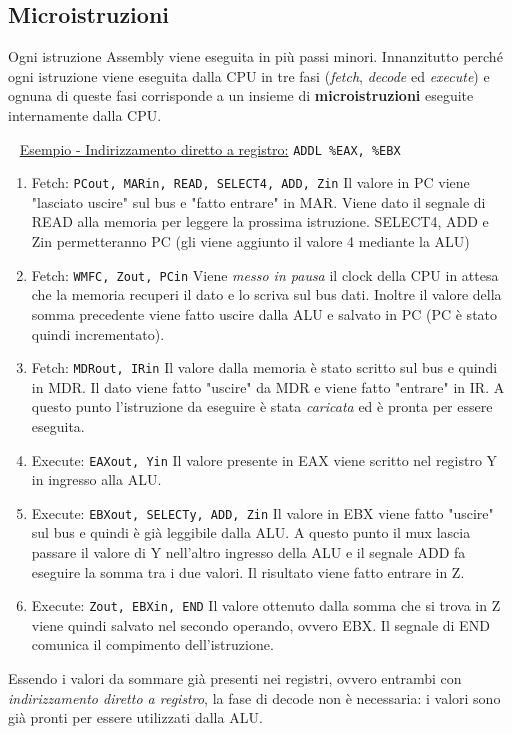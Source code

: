 \documentclass[a4paper,11pt,oneside]{book}
\begin{document}
\subsection{Microistruzioni}
Ogni istruzione Assembly viene eseguita in più passi minori. Innanzitutto perché ogni istruzione viene eseguita dalla CPU in tre fasi (\emph{fetch}, \emph{decode}
ed \emph{execute}) e ognuna di queste fasi corrisponde a un insieme di \textbf{microistruzioni} eseguite internamente dalla CPU.

~\newline
\underline{Esempio - Indirizzamento diretto a registro:} \tabto{9cm} \texttt{ADDL \%EAX, \%EBX}
\begin{enumerate}
    \item Fetch: \texttt{PCout, MARin, READ, SELECT4, ADD, Zin} \newline
          Il valore in PC viene "lasciato uscire" sul bus e "fatto entrare" in MAR. Viene dato il segnale di READ alla memoria per leggere la prossima istruzione. SELECT4, ADD e Zin permetteranno PC (gli viene aggiunto il valore 4 mediante la ALU)

    \item Fetch: \texttt{WMFC, Zout, PCin} \newline
          Viene \emph{messo in pausa} il clock della CPU in attesa che la memoria recuperi il dato e lo scriva sul bus dati. \newline Inoltre il valore della somma precedente viene fatto uscire dalla ALU e salvato in PC (PC è stato quindi incrementato).

    \item Fetch: \texttt{MDRout, IRin} \newline
          Il valore dalla memoria è stato scritto sul bus e quindi in MDR. Il dato viene fatto "uscire" da MDR e viene fatto "entrare" in IR. A questo punto l'istruzione da eseguire è stata \emph{caricata} ed è pronta per essere eseguita.

    \item Execute: \texttt{EAXout, Yin} \newline
          Il valore presente in EAX viene scritto nel registro Y in ingresso alla ALU.

    \item Execute: \texttt{EBXout, SELECTy, ADD, Zin} \newline
          Il valore in EBX viene fatto "uscire" sul bus e quindi è già leggibile dalla ALU. A questo punto il mux lascia passare il valore di Y nell'altro ingresso della ALU e il segnale ADD fa eseguire la somma tra i due valori. Il risultato viene fatto entrare in Z.

    \item Execute: \texttt{Zout, EBXin, END} \newline
          Il valore ottenuto dalla somma che si trova in Z viene quindi salvato nel secondo operando, ovvero EBX. Il segnale di END comunica il compimento dell'istruzione.
\end{enumerate}
Essendo i valori da sommare già presenti nei registri, ovvero entrambi con \emph{indirizzamento diretto a registro}, la fase di decode non è necessaria: i valori sono già pronti per essere utilizzati dalla ALU.
\end{document}
